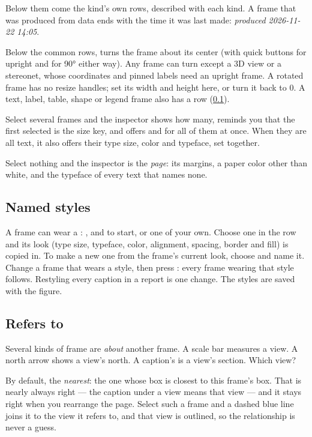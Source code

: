 Below them come the kind's own rows, described with each kind. A frame that was produced from data ends with the time it was last made: \emph{produced 2026-11-22 14:05}.

Below the common rows,  turns the frame about its center (with quick buttons for upright and for 90° either way). Any frame can turn except a 3D view or a stereonet, whose coordinates and pinned labels need an upright frame. A rotated frame has no resize handles; set its width and height here, or turn it back to 0. A text, label, table, shape or legend frame also has a  row (\cref{sec:compo-styles}).

Select several frames and the inspector shows how many, reminds you that the first selected is the size key, and offers  and  for all of them at once. When they are all text, it also offers their type size, color and typeface, set together.

Select nothing and the inspector is the \emph{page}: its margins, a paper color other than white, and the typeface of every text that names none.

\subsection{Named styles}\label{sec:compo-styles}

A frame can wear a : ,  and  to start, or one of your own. Choose one in the  row and its look (type size, typeface, color, alignment, spacing, border and fill) is copied in. To make a new one from the frame's current look, choose  and name it. Change a frame that wears a style, then press : every frame wearing that style follows. Restyling every caption in a report is one change. The styles are saved with the figure.

\subsection{Refers to}\label{sec:compo-refers}

Several kinds of frame are \emph{about} another frame. A scale bar measures a view. A north arrow shows a view's north. A caption's  is a view's section. Which view?

By default, the \emph{nearest}: the one whose box is closest to this frame's box. That is nearly always right — the caption under a view means that view — and it stays right when you rearrange the page. Select such a frame and a dashed blue line joins it to the view it refers to, and that view is outlined, so the relationship is never a guess.

